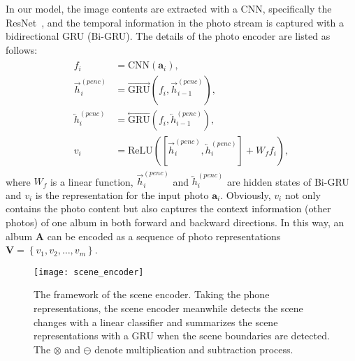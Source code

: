 \documentclass[letterpaper]{article} \usepackage{aaai19}  \usepackage{times}  \usepackage{helvet}  \usepackage{courier}  \usepackage{url}  \usepackage{graphicx}  \usepackage{color}
\begin{document}
In our model, the image contents are extracted with a CNN, specifically the ResNet~\cite{he2016deep}, and the temporal information in the photo stream is captured with a bidirectional GRU (Bi-GRU). The details of the photo encoder are listed as follows:
\begin{align}
\label{eq:photo_encoder}
\begin{split}
  f_i &= \text{CNN}\left(\mathbf{a}_i\right), \\
  \overrightarrow{h}_i^{(penc)} &= \stackrel{\longrightarrow}{\text{GRU}}\left(f_i, \overrightarrow{h}_{i-1}^{(penc)} \right),  \\
  \overleftarrow{h}_i^{(penc)} &= \stackrel{\longleftarrow}{\text{GRU}}\left(f_i, \overleftarrow{h}_{i-1}^{(penc)} \right),  \\
  v_i &= \text{ReLU}\left(\left[\overrightarrow{h}_i^{(penc)},\overleftarrow{h}_i^{(penc)}\right] + W_f f_i\right),
\end{split}
\end{align}
where $W_f$ is a linear function, $\overrightarrow{h}_i^{(penc)}$ and $\overleftarrow{h}_i^{(penc)}$ are hidden states of Bi-GRU and $v_i$ is the representation for the input photo $\mathbf{a}_i$. Obviously, $v_i$ not only contains the photo content but also captures the context information (other photos) of one album in both forward and backward directions.  In this way, an album $\mathbf{A}$ can be encoded as a sequence of photo representations $\mathbf{V}=\left\{v_1,v_2, \dots ,v_m\right\}$.


\begin{figure}[t]
\centering
\texttt{[image: scene\_encoder]}
\caption{The framework of the scene encoder. Taking the phone representations, the scene encoder meanwhile detects the scene changes with a linear classifier and summarizes the scene representations with a GRU when the scene boundaries are detected. The $\otimes$ and $\ominus$ denote multiplication and subtraction process.}
\label{fig:scene_encoder}
\end{figure}
\end{document}
